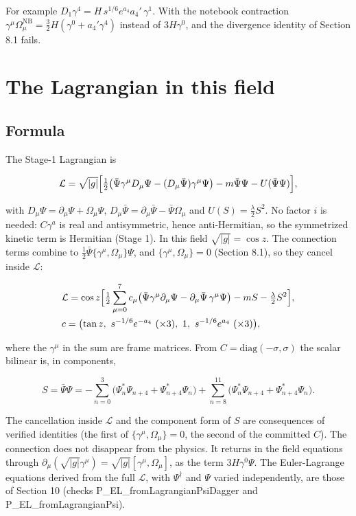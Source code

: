 \documentclass[11pt]{article}
\begin{document}
For example $D_1\gamma^4=H\,s^{1/6}e^{a_4}a_4'\,\gamma^1$. With the notebook contraction $\gamma^\mu\Omega^{\mathrm{NB}}_\mu=\tfrac32H(\gamma^0+a_4'\gamma^4)$ instead of $3H\gamma^0$, and the divergence identity of Section 8.1 fails.

\section{The Lagrangian in this field}

\subsection{Formula}

The Stage-1 Lagrangian is

\[
\mathcal L=\sqrt{|g|}\Bigl[\tfrac12\bigl(\bar\Psi\gamma^\mu D_\mu\Psi-(D_\mu\bar\Psi)\gamma^\mu\Psi\bigr)-m\bar\Psi\Psi-U(\bar\Psi\Psi)\Bigr],
\]

with $D_\mu\Psi=\partial_\mu\Psi+\Omega_\mu\Psi$, $D_\mu\bar\Psi=\partial_\mu\bar\Psi-\bar\Psi\Omega_\mu$ and $U(S)=\tfrac\lambda2S^2$. No factor $i$ is needed: $C\gamma^a$ is real and antisymmetric, hence anti-Hermitian, so the symmetrized kinetic term is Hermitian (Stage 1). In this field $\sqrt{|g|}=\cos z$. The connection terms combine to $\tfrac12\bar\Psi\{\gamma^\mu,\Omega_\mu\}\Psi$, and $\{\gamma^\mu,\Omega_\mu\}=0$ (Section 8.1), so they cancel inside $\mathcal L$:

\[
\begin{aligned}
&\mathcal L=\cos z\Bigl[\tfrac12\sum_{\mu=0}^{7}c_\mu\bigl(\bar\Psi\gamma^\mu\partial_\mu\Psi-\partial_\mu\bar\Psi\,\gamma^\mu\Psi\bigr)-mS-\tfrac\lambda2S^2\Bigr],\\
&c=\bigl(\tan z,\ s^{-1/6}e^{-a_4}\ (\times3),\ 1,\ s^{-1/6}e^{a_4}\ (\times3)\bigr),
\end{aligned}
\]

where the $\gamma^\mu$ in the sum are frame matrices. From $C=\mathrm{diag}(-\sigma,\sigma)$ the scalar bilinear is, in components,

\[
S=\bar\Psi\Psi=-\sum_{n=0}^{3}\bigl(\Psi_n^\ast\Psi_{n+4}+\Psi_{n+4}^\ast\Psi_n\bigr)+\sum_{n=8}^{11}\bigl(\Psi_n^\ast\Psi_{n+4}+\Psi_{n+4}^\ast\Psi_n\bigr).
\]

The cancellation inside $\mathcal L$ and the component form of $S$ are consequences of verified identities (the first of $\{\gamma^\mu,\Omega_\mu\}=0$, the second of the committed $C$). The connection does not disappear from the physics. It returns in the field equations through $\partial_\mu(\sqrt{|g|}\gamma^\mu)=\sqrt{|g|}[\gamma^\mu,\Omega_\mu]$, as the term $3H\gamma^0\Psi$. The Euler-Lagrange equations derived from the full $\mathcal L$, with $\Psi^\dagger$ and $\Psi$ varied independently, are those of Section 10 (checks P\_EL\_fromLagrangianPsiDagger and P\_EL\_fromLagrangianPsi).
\end{document}
